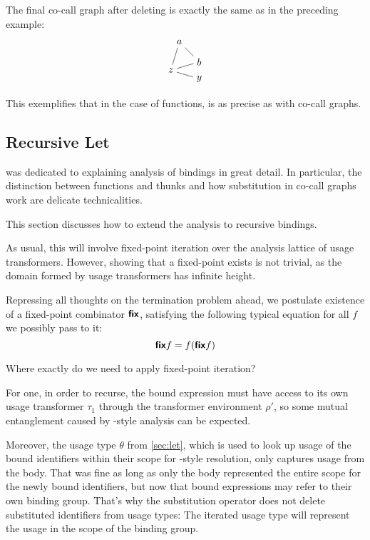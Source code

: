\begin{example}
  The final co-call graph after deleting  is exactly the same as in the preceding example:
  \begin{align*}
    \begin{tikzpicture}[baseline={(0.base)}]
      \node (0) {$z$};
      \node at (1,-0.3) (2) {$y$};
      \node at (0.3, 1) (3) {$a$};
      \node at (1, 0.3) (4) {$b$};
      \draw (3) -- (4);
      \draw (0) -- (3);
      \draw (0) -- (4);
      \draw (0) -- (2);
    \end{tikzpicture}
  \end{align*}

  This exemplifies that in the case of functions,  is as precise as  with co-call graphs.
\end{example}

\subsection{Recursive Let}\label{sec:letrec}

 was dedicated to explaining analysis of  bindings in great detail. 
In particular, the distinction between functions and thunks and how substitution in co-call graphs work are delicate technicalities.

This section discusses how to extend the analysis to recursive  bindings.

As usual, this will involve fixed-point iteration over the analysis lattice of usage transformers.
However, showing that a fixed-point exists is not trivial, as the domain formed by usage transformers has infinite height.

Repressing all thoughts on the termination problem ahead, we postulate existence of a fixed-point combinator $\text{\textsf{\textbf{fix}}}$, satisfying the following typical equation for all $f$ we possibly pass to it:
\[
  \text{\textsf{\textbf{fix}}} f = f (\text{\textsf{\textbf{fix}}} f)
\]

Where exactly do we need to apply fixed-point iteration? 

For one, in order to recurse, the bound expression must have access to its own usage transformer $\tau_1$ through the transformer environment $\rho'$, so some mutual entanglement caused by -style analysis can be expected. 

Moreover, the usage type $\theta$ from \cref{sec:let}, which is used to look up usage of the bound identifiers within their scope for -style resolution, only captures usage from the body. 
That was fine as long as only the body represented the entire scope for the newly bound identifiers, but now that bound expressions may refer to their own binding group. 
That's why the substitution operator does not delete substituted identifiers from usage types:
The iterated usage type will represent the usage in the scope of the binding group.

